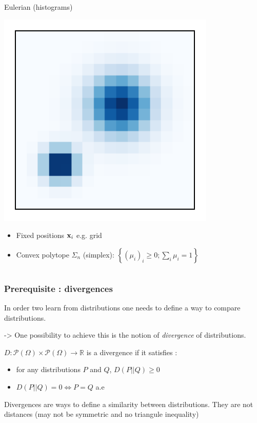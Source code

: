 \documentclass[french,9pt]{beamer}
\newcommand{\x}{{\bf x}}
\begin{document}
\begin{frame}
\begin{columns}[t]
\begin{column}{.45\linewidth}
\begin{block}{Eulerian (histograms)}
\begin{center}
\includegraphics[width=.7\linewidth]{fig/distrib_hist.pdf}
\end{center}\vspace{-5mm}
\begin{itemize}
\item Fixed positions $\x_i$ e.g. grid
\item Convex polytope $\Sigma_n$ (simplex):
$\left\{(\mu_i)_i\geq 0; \sum_i \mu_i=1\right\}$
\end{itemize}
\end{block}
\end{column}
\end{columns}
\end{frame}



\begin{frame}
\frametitle{Prerequisite : divergences}

In order two learn from distributions one needs to define a way to compare distributions. 

-> One possibility to achieve this is the notion of \emph{divergence} of distributions.

\pause 

$D: \mathcal{P}(\Omega) \times  \mathcal{P}(\Omega) \rightarrow \mathbb{R}$ is a divergence if it satisfies :

\begin{itemize}
\item for any distributions $P$ and $Q$, $D(P||Q) \geq 0$
\item $D(P||Q) = 0 \iff P=Q $ a.e
\end{itemize}

\pause 
Divergences are ways to define a similarity between distributions. They are not distances (may not be symmetric and no triangule inequality)

\end{frame}
\end{document}

